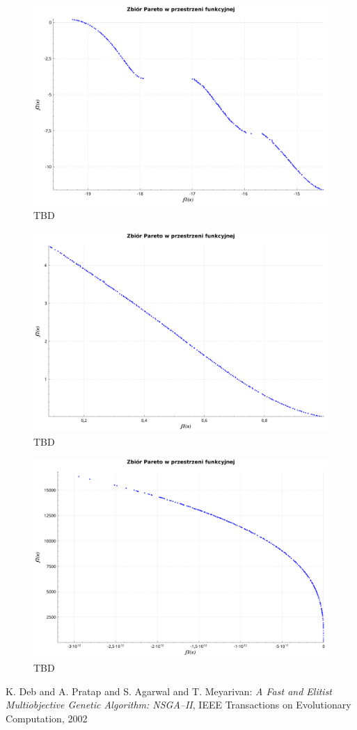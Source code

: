 \documentclass[11pt,a4paper]{article}
\begin{document}
\begin{figure}[H]
\centering
\includegraphics[width=14cm]{kursawe_200_100}
\caption{TBD}
\label{fig:kursawe_200_100}
\end{figure}

\begin{figure}[H]
\centering
\includegraphics[width=14cm]{rosenbrock_ackley_200_100}
\caption{TBD}
\label{fig:rosenbrock_ackley_200_100}
\end{figure}

\begin{figure}[H]
\centering
\includegraphics[width=14cm]{rastrigin_goldstein_200_100}
\caption{TBD}
\label{fig:rastrigin_goldstein_200_100}
\end{figure}

\begin{thebibliography}{9}
 K. Deb and A. Pratap and S. Agarwal and T. Meyarivan:
\emph{A Fast and Elitist Multiobjective Genetic Algorithm: NSGA–II},
IEEE Transactions on Evolutionary Computation, 2002
\end{thebibliography}
\end{document}
